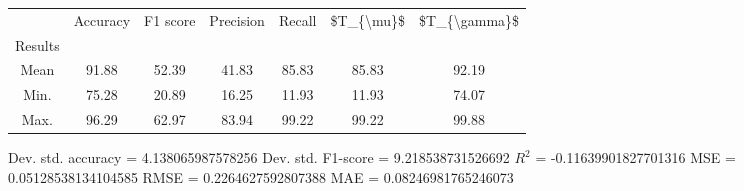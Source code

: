 \begin{tabular}{|c|c|c|c|c|c|c|}
\toprule
{} &  Accuracy &  F1 score &  Precision &  Recall &  \$T\_\{\textbackslash mu\}\$ &  \$T\_\{\textbackslash gamma\}\$ \\
Results &           &           &            &         &            &               \\
\hline
Mean    &     91.88 &     52.39 &      41.83 &   85.83 &      85.83 &         92.19 \\
Min.    &     75.28 &     20.89 &      16.25 &   11.93 &      11.93 &         74.07 \\
Max.    &     96.29 &     62.97 &      83.94 &   99.22 &      99.22 &         99.88 \\
\bottomrule
\end{tabular}

 Dev. std. accuracy = 4.138065987578256
 Dev. std. F1-score = 9.218538731526692
 $R^2$ = -0.11639901827701316
 MSE = 0.05128538134104585
 RMSE = 0.2264627592807388
 MAE = 0.08246981765246073